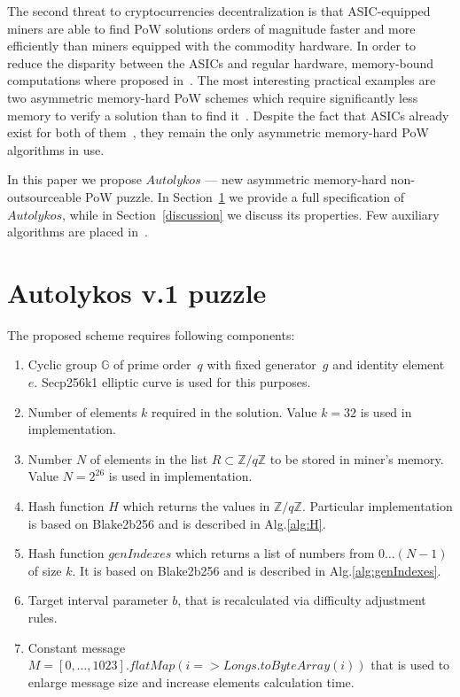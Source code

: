 \documentclass[]{article}
\newcommand{\Name}{$Autolykos$}
\begin{document}
    The second threat to cryptocurrencies decentralization is that ASIC-equipped miners are
    able to find PoW solutions orders of magnitude faster and more efficiently
    than miners equipped with the commodity hardware. In order to reduce the
    disparity between the ASICs and regular hardware, memory-bound computations
    where proposed in~\cite{dwork2003memory}. The most interesting practical
    examples are two
    asymmetric memory-hard PoW schemes which require significantly less memory
    to verify a solution than to find it~\cite{biryukov2017equihash,ethHash}.
    Despite the fact that ASICs already exist for both of them~\cite{ETHAsics,EquihashAsics},
    they remain the only asymmetric memory-hard PoW algorithms in use.

    In this paper we propose \Name{} --- new asymmetric memory-hard non-outsourceable PoW puzzle.
    In Section~\ref{puzzle} we provide a full
    specification of \Name, while in Section~\ref{discussion} we discuss its
    properties. Few auxiliary algorithms are placed in~.

    \section{Autolykos v.1 puzzle}
    \label{puzzle}

    The proposed scheme requires following components:
    \begin{enumerate}
        \item Cyclic group $\mathbb{G}$ of prime order~$q$ with fixed generator~$g$
        and identity element~$e$.
        Secp256k1 elliptic curve is used for this purposes.
        \item Number of elements $k$ required in the solution. Value $k=32$ is used in
        implementation.
        \item Number $N$ of elements in the list
        $R\subset\mathbb{Z}/q\mathbb{Z}$ to be stored in miner's memory.
        Value $N=2^{26}$ is used in implementation.
        \item Hash function $H$ which returns the values in $\mathbb{Z}/q\mathbb{Z}$.
        Particular implementation is based on Blake2b256 and is described in Alg.\ref{alg:H}.
        \item Hash function $genIndexes$ which returns a list of numbers from
        $0\dots(N-1)$ of size $k$.
        It is based on Blake2b256 and is described in Alg.\ref{alg:genIndexes}.
        \item Target interval parameter $b$, that is recalculated via difficulty adjustment rules.
        \item Constant message $M=[0,\dots,1023].flatMap(i => Longs.toByteArray(i))$ that is used to enlarge message size and increase elements calculation time.
    \end{enumerate}
\end{document}
